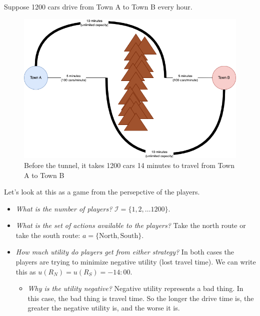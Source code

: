 \documentclass[11pt]{article}
\begin{document}
Suppose 1200 cars drive from Town A to Town B every hour. 

\begin{figure}
    \centering
    \includegraphics[width=5in]{braess_1.png}
    \caption{Before the tunnel, it takes 1200 cars 14 minutes to travel from Town A to Town B}
\end{figure}


Let's look at this as a game from the persepctive of the players. 

\begin{itemize}
    \item {\it What is the number of players?} $\mathcal{I} = \{1,2,\ldots 1200\}$.
    \item {\it What is the set of actions available to the players?} Take the north route or take the south route: $a = \{\text{North}, \text{South}\}$.
    \item {\it How much utility do players get from either strategy?} In both cases the players are trying to minimize negative utility (lost travel time). We can write this as $u(R_N) = u(R_S) = -14{:}00$.
    \begin{itemize}
        \item {\it Why is the utility negative?} Negative utility represents a bad thing. In this case, the bad thing is travel time. So the longer the drive time is, the greater the negative utility is, and the worse it is.
    \end{itemize}
\end{itemize}
\end{document}

